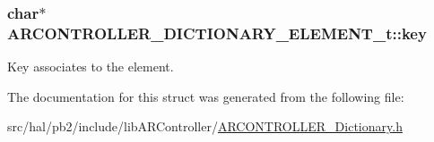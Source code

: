 \subsubsection[{\texorpdfstring{key}{key}}]{\setlength{\rightskip}{0pt plus 5cm}char$\ast$ A\+R\+C\+O\+N\+T\+R\+O\+L\+L\+E\+R\+\_\+\+D\+I\+C\+T\+I\+O\+N\+A\+R\+Y\+\_\+\+E\+L\+E\+M\+E\+N\+T\+\_\+t\+::key}\hypertarget{struct_a_r_c_o_n_t_r_o_l_l_e_r___d_i_c_t_i_o_n_a_r_y___e_l_e_m_e_n_t__t_a057300a8b5bc253c3cb3adb089a0d614}{}\label{struct_a_r_c_o_n_t_r_o_l_l_e_r___d_i_c_t_i_o_n_a_r_y___e_l_e_m_e_n_t__t_a057300a8b5bc253c3cb3adb089a0d614}
Key associates to the element. 

The documentation for this struct was generated from the following file\+:\begin{DoxyCompactItemize}
\item 
src/hal/pb2/include/lib\+A\+R\+Controller/\hyperlink{_a_r_c_o_n_t_r_o_l_l_e_r___dictionary_8h}{A\+R\+C\+O\+N\+T\+R\+O\+L\+L\+E\+R\+\_\+\+Dictionary.\+h}\end{DoxyCompactItemize}

